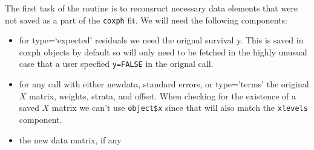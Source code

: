 \documentclass{article}
\newcommand{\code}[1]{\texttt{#1}}
\begin{document}
The first task of the routine is to reconsruct necessary data elements
that were not saved as a part of the \code{coxph} fit.  
We will need the following components: 
\begin{itemize}
  \item for type=`expected' residuals we need the orignal survival y.  This %
    is saved in coxph objects by default so will only need to be fetched in
    the highly unusual case that a user specfied 
    \code{y=FALSE} in the orignal call.
  \item for any call with either newdata, standard errors, or type='terms'
     the original $X$ matrix, weights, strata, and offset. 
     When checking for the existence of a saved $X$ matrix we can't    %
     use \code{object\$x}
     since that will also match the \code{xlevels} component.
  \item the new data matrix, if any 
\end{itemize}

\end{document}
